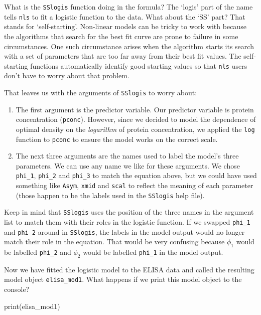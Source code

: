 \documentclass[
]{book}
\newenvironment{Shaded}{\begin{snugshade}}{\end{snugshade}}
\newcommand{\FunctionTok}[1]{\textcolor[rgb]{0.00,0.00,0.00}{#1}}
\newcommand{\NormalTok}[1]{#1}
\begin{document}
What is the \texttt{SSlogis} function doing in the formula? The `logis' part of the name tells \texttt{nls} to fit a logistic function to the data. What about the `SS' part? That stands for `self-starting'. Non-linear models can be tricky to work with because the algorithms that search for the best fit curve are prone to failure in some circumstances. One such circumstance arises when the algorithm starts its search with a set of parameters that are too far away from their best fit values. The self-starting functions automatically identify good starting values so that \texttt{nls} users don't have to worry about that problem.

That leaves us with the arguments of \texttt{SSlogis} to worry about:

\begin{enumerate}
\def\labelenumi{\arabic{enumi}.}
\item
  The first argument is the predictor variable. Our predictor variable is protein concentration (\texttt{pconc}). However, since we decided to model the dependence of optimal density on the \emph{logarithm} of protein concentration, we applied the \texttt{log} function to \texttt{pconc} to ensure the model works on the correct scale.
\item
  The next three arguments are the names used to label the model's three parameters. We can use any name we like for these arguments. We chose \texttt{phi\_1}, \texttt{phi\_2} and \texttt{phi\_3} to match the equation above, but we could have used something like \texttt{Asym}, \texttt{xmid} and \texttt{scal} to reflect the meaning of each parameter (those happen to be the labels used in the \texttt{SSlogis} help file).
\end{enumerate}

Keep in mind that \texttt{SSlogis} uses the position of the three names in the argument list to match them with their roles in the logistic function. If we swapped \texttt{phi\_1} and \texttt{phi\_2} around in \texttt{SSlogis}, the labels in the model output would no longer match their role in the equation. That would be very confusing because \(\phi_1\) would be labelled \texttt{phi\_2} and \(\phi_2\) would be labelled \texttt{phi\_1} in the model output.

Now we have fitted the logistic model to the ELISA data and called the resulting model object \texttt{elisa\_mod1}. What happens if we print this model object to the console?

\begin{Shaded}
\begin{Highlighting}[]
\FunctionTok{print}\NormalTok{(elisa\_mod1)}
\end{Highlighting}
\end{Shaded}
\end{document}
